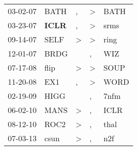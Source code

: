 \begin{supertabular}{p{0.07\textwidth}p{0.06\textwidth}p{0.02\textwidth}p{0.02\textwidth}p{0.06\textwidth}}
          03-02-07\textsuperscript{} &           BATH\textsuperscript{} &                , &     \textgreater &           BATH\textsuperscript{} \\
          03-23-07\textsuperscript{} &  \textbf{ICLR\textsuperscript{}} &                , &     \textgreater &           srms\textsuperscript{} \\
          09-14-07\textsuperscript{} &           SELF\textsuperscript{} &     \textgreater &     \textgreater &           ring\textsuperscript{} \\
          12-01-07\textsuperscript{} &           BRDG\textsuperscript{} &                  &                , &            WIZ\textsuperscript{} \\
          07-17-08\textsuperscript{} &           flip\textsuperscript{} &     \textgreater &     \textgreater &           SOUP\textsuperscript{} \\
          11-20-08\textsuperscript{} &            EX1\textsuperscript{} &                , &     \textgreater &           WORD\textsuperscript{} \\
          02-19-09\textsuperscript{} &           HIGG\textsuperscript{} &                  &                , &           7nfm\textsuperscript{} \\
          06-02-10\textsuperscript{} &           MANS\textsuperscript{} &     \textgreater &                , &           ICLR\textsuperscript{} \\
          08-12-10\textsuperscript{} &           ROC2\textsuperscript{} &     \textgreater &                , &           thal\textsuperscript{} \\
          07-03-13\textsuperscript{} &           csun\textsuperscript{} &     \textgreater &                , &            n2f\textsuperscript{} \\
\end{supertabular}

